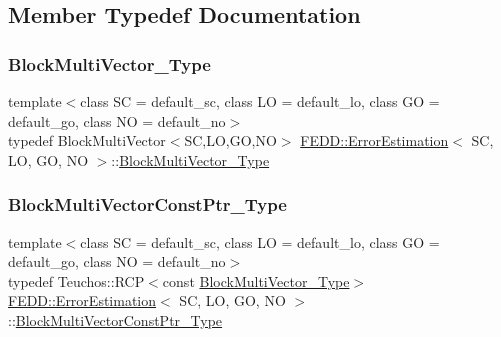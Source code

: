\subsection{Member Typedef Documentation}
\mbox{\label{classFEDD_1_1ErrorEstimation_a91845e337e3d46305cd20c0c9cb08cdc}} 
\subsubsection{\texorpdfstring{Block\+Multi\+Vector\+\_\+\+Type}{BlockMultiVector\_Type}}
{\footnotesize\ttfamily template$<$class SC = default\+\_\+sc, class LO = default\+\_\+lo, class GO = default\+\_\+go, class NO = default\+\_\+no$>$ \\
typedef Block\+Multi\+Vector$<$SC,LO,GO,NO$>$ \hyperlink{classFEDD_1_1ErrorEstimation}{F\+E\+D\+D\+::\+Error\+Estimation}$<$ SC, LO, GO, NO $>$\+::\hyperlink{classFEDD_1_1ErrorEstimation_a91845e337e3d46305cd20c0c9cb08cdc}{Block\+Multi\+Vector\+\_\+\+Type}}

\mbox{\label{classFEDD_1_1ErrorEstimation_a8a53d809dfcf71abaffe46f85e6b4aa1}} 
\subsubsection{\texorpdfstring{Block\+Multi\+Vector\+Const\+Ptr\+\_\+\+Type}{BlockMultiVectorConstPtr\_Type}}
{\footnotesize\ttfamily template$<$class SC = default\+\_\+sc, class LO = default\+\_\+lo, class GO = default\+\_\+go, class NO = default\+\_\+no$>$ \\
typedef Teuchos\+::\+R\+CP$<$const \hyperlink{classFEDD_1_1ErrorEstimation_a91845e337e3d46305cd20c0c9cb08cdc}{Block\+Multi\+Vector\+\_\+\+Type}$>$ \hyperlink{classFEDD_1_1ErrorEstimation}{F\+E\+D\+D\+::\+Error\+Estimation}$<$ SC, LO, GO, NO $>$\+::\hyperlink{classFEDD_1_1ErrorEstimation_a8a53d809dfcf71abaffe46f85e6b4aa1}{Block\+Multi\+Vector\+Const\+Ptr\+\_\+\+Type}}

